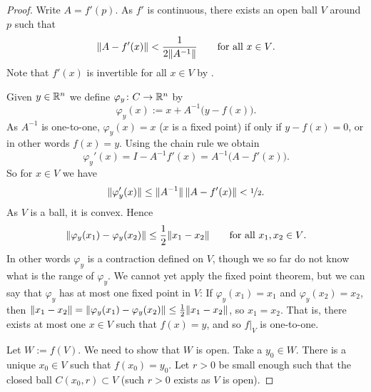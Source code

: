 \begin{proof}
Write $A = f'(p)$.  As $f'$ is continuous, there exists an open ball
$V$ around $p$ such that
\begin{equation*}
\lVert {A-f'(x)} \rVert < \frac{1}{2\lVert {A^{-1}} \rVert}
\qquad \text{for all $x \in V$.}
\end{equation*}
Note that $f'(x)$ is invertible for all $x \in V$
by .

Given $y \in {\mathbb{R}}^n$ we define $\varphi_y \colon C \to {\mathbb{R}}^n$ by
\begin{equation*}
\varphi_y (x) := x + A^{-1}\bigl(y-f(x)\bigr) .
\end{equation*}
As $A^{-1}$ is one-to-one,
$\varphi_y(x) = x$ ($x$ is a fixed point) if only if
$y-f(x) = 0$, or in other words $f(x)=y$.  Using the chain rule we obtain
\begin{equation*}
\varphi_y'(x) = I - A^{-1} f'(x) = A^{-1} \bigl( A-f'(x) \bigr) .
\end{equation*}
So for $x \in V$ we have
\begin{equation*}
\lVert {\varphi_y'(x)} \rVert \leq \lVert {A^{-1}} \rVert \, \lVert {A-f'(x)} \rVert < \nicefrac{1}{2} .
\end{equation*}
As $V$ is a ball, it is convex.  Hence
\begin{equation*}
\lVert {\varphi_y(x_1)-\varphi_y(x_2)} \rVert \leq \frac{1}{2} \lVert {x_1-x_2} \rVert 
\qquad
\text{for all $x_1,x_2 \in V$}.
\end{equation*}
In other words $\varphi_y$ is a contraction defined on $V$, though we so far
do not know what is the range of $\varphi_y$.  We cannot yet
apply the fixed
point theorem, but we can say that $\varphi_y$ 
has at most one fixed point in $V$:
If $\varphi_y(x_1) = x_1$ and
$\varphi_y(x_2) = x_2$, then
$\lVert {x_1-x_2} \rVert = \lVert {\varphi_y(x_1)-\varphi_y(x_2)} \rVert \leq
\frac{1}{2} \lVert {x_1-x_2} \rVert$, so $x_1 = x_2$.
That is, there exists at most one $x \in V$
such that $f(x) = y$, and so $f|_V$ is one-to-one.

Let $W := f(V)$.  We need to show that $W$ is open.  Take a $y_0 \in W$.
There is a unique $x_0 \in V$ such that $f(x_0) = y_0$.
Let $r > 0$ be small enough such that the closed ball $C(x_0,r) \subset V$
(such $r > 0$ exists as $V$ is open).


\end{proof}

